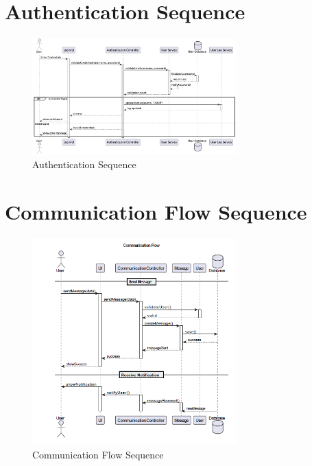 \documentclass[12pt,a4paper]{report}
\begin{document}
\section{Authentication Sequence}
\begin{figure}[htbp]
    \centering
    \includegraphics[width=0.7\textwidth]{authentication-sequence.png}
    \caption{Authentication Sequence}
    \label{fig:authentication-sequence}
\end{figure}

\section{Communication Flow Sequence}
\begin{figure}[htbp]
    \centering
    \includegraphics[width=0.7\textwidth]{communication-flow-sequence.png}
    \caption{Communication Flow Sequence}
    \label{fig:communication-flow-sequence}
\end{figure}
\end{document}
